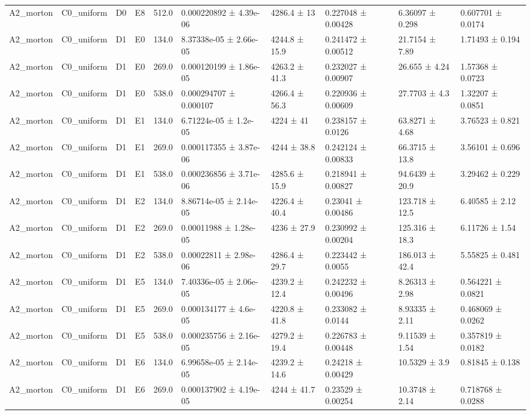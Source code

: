 \begin{table}
\begin{tabular}{llllllllll}
A2\_morton & C0\_uniform & D0 & E8 & 512.0 & 0.000220892 ± 4.39e-06 & 4286.4 ± 13 & 0.227048 ± 0.00428 & 6.36097 ± 0.298 & 0.607701 ± 0.0174 \\
A2\_morton & C0\_uniform & D1 & E0 & 134.0 & 8.37338e-05 ± 2.66e-05 & 4244.8 ± 15.9 & 0.241472 ± 0.00512 & 21.7154 ± 7.89 & 1.71493 ± 0.194 \\
A2\_morton & C0\_uniform & D1 & E0 & 269.0 & 0.000120199 ± 1.86e-05 & 4263.2 ± 41.3 & 0.232027 ± 0.00907 & 26.655 ± 4.24 & 1.57368 ± 0.0723 \\
A2\_morton & C0\_uniform & D1 & E0 & 538.0 & 0.000294707 ± 0.000107 & 4266.4 ± 56.3 & 0.220936 ± 0.00609 & 27.7703 ± 4.3 & 1.32207 ± 0.0851 \\
A2\_morton & C0\_uniform & D1 & E1 & 134.0 & 6.71224e-05 ± 1.2e-05 & 4224 ± 41 & 0.238157 ± 0.0126 & 63.8271 ± 4.68 & 3.76523 ± 0.821 \\
A2\_morton & C0\_uniform & D1 & E1 & 269.0 & 0.000117355 ± 3.87e-06 & 4244 ± 38.8 & 0.242124 ± 0.00833 & 66.3715 ± 13.8 & 3.56101 ± 0.696 \\
A2\_morton & C0\_uniform & D1 & E1 & 538.0 & 0.000236856 ± 3.71e-06 & 4285.6 ± 15.9 & 0.218941 ± 0.00827 & 94.6439 ± 20.9 & 3.29462 ± 0.229 \\
A2\_morton & C0\_uniform & D1 & E2 & 134.0 & 8.86714e-05 ± 2.14e-05 & 4226.4 ± 40.4 & 0.23041 ± 0.00486 & 123.718 ± 12.5 & 6.40585 ± 2.12 \\
A2\_morton & C0\_uniform & D1 & E2 & 269.0 & 0.00011988 ± 1.28e-05 & 4236 ± 27.9 & 0.230992 ± 0.00204 & 125.316 ± 18.3 & 6.11726 ± 1.54 \\
A2\_morton & C0\_uniform & D1 & E2 & 538.0 & 0.00022811 ± 2.98e-06 & 4286.4 ± 29.7 & 0.223442 ± 0.0055 & 186.013 ± 42.4 & 5.55825 ± 0.481 \\
A2\_morton & C0\_uniform & D1 & E5 & 134.0 & 7.40336e-05 ± 2.06e-05 & 4239.2 ± 12.4 & 0.242232 ± 0.00496 & 8.26313 ± 2.98 & 0.564221 ± 0.0821 \\
A2\_morton & C0\_uniform & D1 & E5 & 269.0 & 0.000134177 ± 4.6e-05 & 4220.8 ± 41.8 & 0.233082 ± 0.0144 & 8.93335 ± 2.11 & 0.468069 ± 0.0262 \\
A2\_morton & C0\_uniform & D1 & E5 & 538.0 & 0.000235756 ± 2.16e-05 & 4279.2 ± 19.4 & 0.226783 ± 0.00448 & 9.11539 ± 1.54 & 0.357819 ± 0.0182 \\
A2\_morton & C0\_uniform & D1 & E6 & 134.0 & 6.99658e-05 ± 2.14e-05 & 4239.2 ± 14.6 & 0.24218 ± 0.00429 & 10.5329 ± 3.9 & 0.81845 ± 0.138 \\
A2\_morton & C0\_uniform & D1 & E6 & 269.0 & 0.000137902 ± 4.19e-05 & 4244 ± 41.7 & 0.23529 ± 0.00254 & 10.3748 ± 2.14 & 0.718768 ± 0.0288 \\

\end{tabular}
\end{table}
